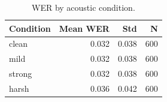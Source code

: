\begin{table}[t]
\centering
\caption{WER by acoustic condition.}
\label{tab:wer}
\begin{tabular}{lrrr}
\toprule
Condition & Mean WER & Std & N \\
\midrule
clean & 0.032 & 0.038 & 600 \\
mild & 0.032 & 0.038 & 600 \\
strong & 0.032 & 0.038 & 600 \\
harsh & 0.036 & 0.042 & 600 \\
\bottomrule
\end{tabular}
\end{table}
